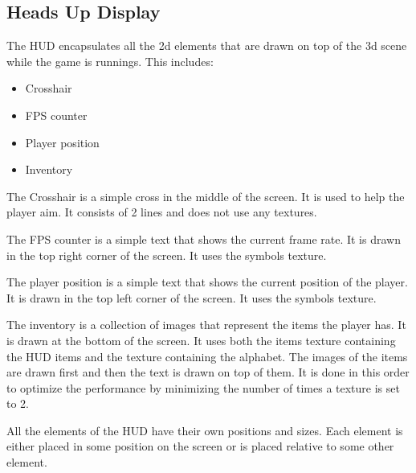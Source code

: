 \subsection{Heads Up Display} \label{sec:hud}
The HUD encapsulates all the 2d elements that are drawn on top of the 3d scene while the game is runnings.
This includes:
\begin{itemize}
    \item Crosshair
    \item FPS counter
    \item Player position
    \item Inventory
\end{itemize}

The Crosshair is a simple cross in the middle of the screen.
It is used to help the player aim.
It consists of 2 lines and does not use any textures.

The FPS counter is a simple text that shows the current frame rate.
It is drawn in the top right corner of the screen.
It uses the symbols texture.

The player position is a simple text that shows the current position of the player.
It is drawn in the top left corner of the screen.
It uses the symbols texture.

The inventory is a collection of images that represent the items the player has.
It is drawn at the bottom of the screen.
It uses both the items texture containing the HUD items and the texture containing the alphabet.
The images of the items are drawn first and then the text is drawn on top of them.
It is done in this order to optimize the performance by minimizing the number of times a texture is set to 2.

All the elements of the HUD have their own positions and sizes.
Each element is either placed in some position on the screen or is placed relative to some other element.